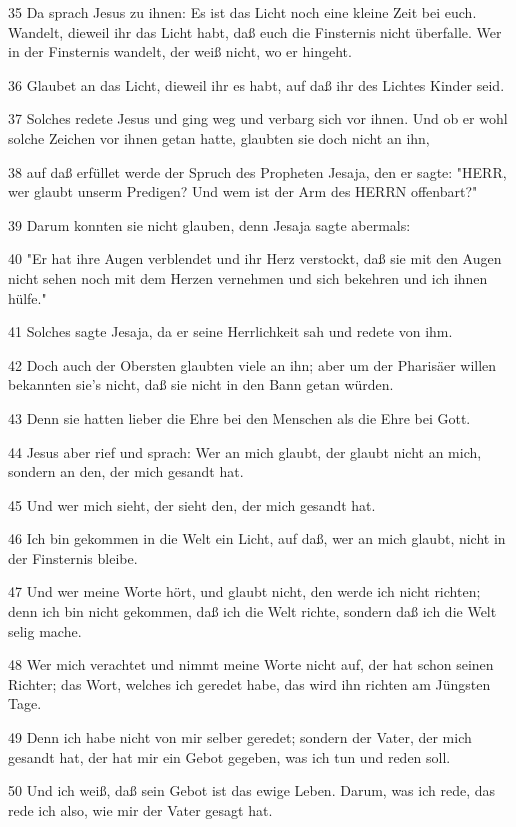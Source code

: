 \par 35 Da sprach Jesus zu ihnen: Es ist das Licht noch eine kleine Zeit bei euch. Wandelt, dieweil ihr das Licht habt, daß euch die Finsternis nicht überfalle. Wer in der Finsternis wandelt, der weiß nicht, wo er hingeht.
\par 36 Glaubet an das Licht, dieweil ihr es habt, auf daß ihr des Lichtes Kinder seid.
\par 37 Solches redete Jesus und ging weg und verbarg sich vor ihnen. Und ob er wohl solche Zeichen vor ihnen getan hatte, glaubten sie doch nicht an ihn,
\par 38 auf daß erfüllet werde der Spruch des Propheten Jesaja, den er sagte: "HERR, wer glaubt unserm Predigen? Und wem ist der Arm des HERRN offenbart?"
\par 39 Darum konnten sie nicht glauben, denn Jesaja sagte abermals:
\par 40 "Er hat ihre Augen verblendet und ihr Herz verstockt, daß sie mit den Augen nicht sehen noch mit dem Herzen vernehmen und sich bekehren und ich ihnen hülfe."
\par 41 Solches sagte Jesaja, da er seine Herrlichkeit sah und redete von ihm.
\par 42 Doch auch der Obersten glaubten viele an ihn; aber um der Pharisäer willen bekannten sie's nicht, daß sie nicht in den Bann getan würden.
\par 43 Denn sie hatten lieber die Ehre bei den Menschen als die Ehre bei Gott.
\par 44 Jesus aber rief und sprach: Wer an mich glaubt, der glaubt nicht an mich, sondern an den, der mich gesandt hat.
\par 45 Und wer mich sieht, der sieht den, der mich gesandt hat.
\par 46 Ich bin gekommen in die Welt ein Licht, auf daß, wer an mich glaubt, nicht in der Finsternis bleibe.
\par 47 Und wer meine Worte hört, und glaubt nicht, den werde ich nicht richten; denn ich bin nicht gekommen, daß ich die Welt richte, sondern daß ich die Welt selig mache.
\par 48 Wer mich verachtet und nimmt meine Worte nicht auf, der hat schon seinen Richter; das Wort, welches ich geredet habe, das wird ihn richten am Jüngsten Tage.
\par 49 Denn ich habe nicht von mir selber geredet; sondern der Vater, der mich gesandt hat, der hat mir ein Gebot gegeben, was ich tun und reden soll.
\par 50 Und ich weiß, daß sein Gebot ist das ewige Leben. Darum, was ich rede, das rede ich also, wie mir der Vater gesagt hat.

